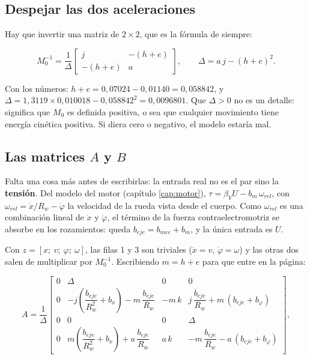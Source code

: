 \documentclass[11pt,a4paper]{report}
\begin{document}
\subsection{Despejar las dos aceleraciones}

Hay que invertir una matriz de $2\times2$, que es la fórmula de siempre:

\begin{equation}
M_0^{-1} = \frac{1}{\Delta}\begin{bmatrix} j & -(h+e) \\ -(h+e) & a \end{bmatrix},
\qquad
\Delta = a\,j - (h+e)^2 .
\end{equation}

Con los números: $h + e = 0{,}07024 - 0{,}01140 = 0{,}058842$, y
$\Delta = 1{,}3119 \times 0{,}010018 - 0{,}058842^2 = 0{,}0096801$. Que $\Delta > 0$ no es un
detalle: significa que $M_0$ es definida positiva, o sea que cualquier movimiento tiene energía
cinética positiva. Si diera cero o negativo, el modelo estaría mal.

\subsection{Las matrices $A$ y $B$}

Falta una cosa más antes de escribirlas: la entrada real no es el par sino la \textbf{tensión}.
Del modelo del motor (capítulo \ref{cap:motor}), $\tau = \beta_V U - b_m\,\omega_{rel}$, con
$\omega_{rel} = \dot x/R_w - \dot\varphi$ la velocidad de la rueda vista desde el cuerpo. Como
$\omega_{rel}$ es una combinación lineal de $\dot x$ y $\dot\varphi$, el término de la fuerza
contraelectromotriz se absorbe en los rozamientos: queda $b_{eje} = b_{mec} + b_m$, y la única
entrada es $U$.

Con $z = [x;\ v;\ \varphi;\ \omega]$, las filas 1 y 3 son triviales ($\dot x = v$,
$\dot\varphi = \omega$) y las otras dos salen de multiplicar por $M_0^{-1}$. Escribiendo
$m = h + e$ para que entre en la página:

\begin{equation}
A = \frac{1}{\Delta}
\begin{bmatrix}
0 & \Delta & 0 & 0 \\[3pt]
0 & -j\left(\dfrac{b_{eje}}{R_w^2} + b_x\right) - m\,\dfrac{b_{eje}}{R_w}
  & -m\,k
  & j\,\dfrac{b_{eje}}{R_w} + m\,(b_{eje}+b_\varphi) \\[10pt]
0 & 0 & 0 & \Delta \\[3pt]
0 & m\left(\dfrac{b_{eje}}{R_w^2} + b_x\right) + a\,\dfrac{b_{eje}}{R_w}
  & a\,k
  & -m\,\dfrac{b_{eje}}{R_w} - a\,(b_{eje}+b_\varphi)
\end{bmatrix},
\end{equation}
\end{document}
